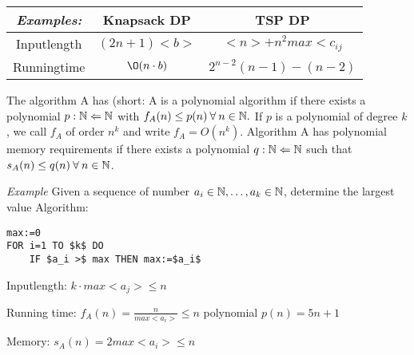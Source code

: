 \begin{xmp+}
	\begin{tabular}{c|c|c}
	\emph{Examples:} & Knapsack DP & TSP DP \\
	\hline
	Inputlength & $(2n+1)<b>$ & $<n>+n^2 max<c_{ij}$ \\
	Runningtime & $\O (n\cdot b)$ & $2^{n-2}(n-1)-(n-2)$ \\
	\end{tabular}
\end{xmp+}

The algorithm A has  (short: A is a polynomial algorithm if there exists a polynomial $p:\mathbb{N} \Leftarrow \mathbb{N} $ with $f_A(n) \leq p(n) \: \forall \: n \in \mathbb{N}.$ If $p$ is a polynomial of degree $k$, we call $f_A$ of order $n^k$ and write $f_A= O(n^k)$. Algorithm A has polynomial memory requirements if there exists a polynomial $q:\mathbb{N} \Leftarrow \mathbb{N}$ such that $s_A(n) \leq q(n) \: \forall \: n \in \mathbb{N}$.

\emph{Example} Given a sequence of number $ a_i\in \mathbb{N}, \dots, a_k \in \mathbb{N}$, determine the largest value
Algorithm:
\begin{lstlisting}
max:=0
FOR i=1 TO $k$ DO
	IF $a_i >$ max THEN max:=$a_i$
\end{lstlisting}
Inputlength: $k \cdot max<a_j> \leq n$

Running time: $f_A(n)=\frac n {max<a_i>} \leq n$
				polynomial $p(n)=5n+1 $
				
Memory: $s_A(n)=2 max<a_i> \leq n$
